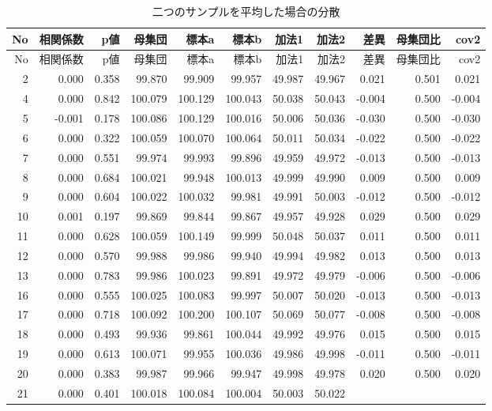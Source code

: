 \documentclass[]{tufte-handout}
\begin{document}
\begin{longtable}[]{@{}rrrrrrrrrrr@{}}
\caption{二つのサンプルを平均した場合の分散}\tabularnewline
\toprule
No & 相関係数 & p値 & 母集団 & 標本a & 標本b & 加法1 & 加法2 & 差異 &
母集団比 & cov2 \\
\midrule
\endfirsthead
\toprule
No & 相関係数 & p値 & 母集団 & 標本a & 標本b & 加法1 & 加法2 & 差異 &
母集団比 & cov2 \\
\midrule
\endhead
2 & 0.000 & 0.358 & 99.870 & 99.909 & 99.957 & 49.987 & 49.967 & 0.021 &
0.501 & 0.021 \\
4 & 0.000 & 0.842 & 100.079 & 100.129 & 100.043 & 50.038 & 50.043 &
-0.004 & 0.500 & -0.004 \\
5 & -0.001 & 0.178 & 100.086 & 100.129 & 100.016 & 50.006 & 50.036 &
-0.030 & 0.500 & -0.030 \\
6 & 0.000 & 0.322 & 100.059 & 100.070 & 100.064 & 50.011 & 50.034 &
-0.022 & 0.500 & -0.022 \\
7 & 0.000 & 0.551 & 99.974 & 99.993 & 99.896 & 49.959 & 49.972 & -0.013
& 0.500 & -0.013 \\
8 & 0.000 & 0.684 & 100.021 & 99.948 & 100.013 & 49.999 & 49.990 & 0.009
& 0.500 & 0.009 \\
9 & 0.000 & 0.604 & 100.022 & 100.032 & 99.981 & 49.991 & 50.003 &
-0.012 & 0.500 & -0.012 \\
10 & 0.001 & 0.197 & 99.869 & 99.844 & 99.867 & 49.957 & 49.928 & 0.029
& 0.500 & 0.029 \\
11 & 0.000 & 0.628 & 100.059 & 100.149 & 99.999 & 50.048 & 50.037 &
0.011 & 0.500 & 0.011 \\
12 & 0.000 & 0.570 & 99.988 & 99.986 & 99.940 & 49.994 & 49.982 & 0.013
& 0.500 & 0.013 \\
13 & 0.000 & 0.783 & 99.986 & 100.023 & 99.891 & 49.972 & 49.979 &
-0.006 & 0.500 & -0.006 \\
16 & 0.000 & 0.555 & 100.025 & 100.083 & 99.997 & 50.007 & 50.020 &
-0.013 & 0.500 & -0.013 \\
17 & 0.000 & 0.718 & 100.092 & 100.200 & 100.107 & 50.069 & 50.077 &
-0.008 & 0.500 & -0.008 \\
18 & 0.000 & 0.493 & 99.936 & 99.861 & 100.044 & 49.992 & 49.976 & 0.015
& 0.500 & 0.015 \\
19 & 0.000 & 0.613 & 100.071 & 99.955 & 100.036 & 49.986 & 49.998 &
-0.011 & 0.500 & -0.011 \\
20 & 0.000 & 0.383 & 99.987 & 99.966 & 99.947 & 49.998 & 49.978 & 0.020
& 0.500 & 0.020 \\
21 & 0.000 & 0.401 & 100.018 & 100.084 & 100.004 & 50.003 & 50.022 &

\end{longtable}
\end{document}
